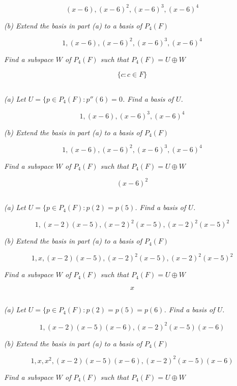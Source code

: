 \documentclass[11pt,oneside,titlepage]{book}
\begin{document}
$$(x - 6), (x - 6)^2, (x - 6)^3, (x - 6)^4$$

\textit{(b) Extend the basis in part (a) to a basis of $P_4(F)$}

$$1, (x - 6), (x - 6)^2, (x - 6)^3, (x - 6)^4$$

\textit{Find a subspace $W$ of $P_4(F)$ such that $P_4(F) = U \oplus W$}

$$\{c: c \in F\}$$

\subsection{}
\textit{(a) Let $U = \{p \in P_4(F): p''(6) = 0$. Find a basis of $U$.}

$$1, (x - 6), (x - 6)^3, (x - 6)^4$$

\textit{(b) Extend the basis in part (a) to a basis of $P_4(F)$}

$$1, (x - 6), (x - 6)^2, (x - 6)^3, (x - 6)^4$$

\textit{Find a subspace $W$ of $P_4(F)$ such that $P_4(F) = U \oplus W$}

$$ (x - 6)^2$$


\subsection{}
\textit{(a) Let $U = \{p \in P_4(F): p(2) = p(5)$. Find a basis of $U$.}

$$1, (x - 2)(x - 5), (x - 2)^2(x - 5), (x - 2)^2(x - 5)^2$$

\textit{(b) Extend the basis in part (a) to a basis of $P_4(F)$}

$$1, x, (x - 2)(x - 5), (x - 2)^2(x - 5), (x - 2)^2(x - 5)^2$$

\textit{Find a subspace $W$ of $P_4(F)$ such that $P_4(F) = U \oplus W$}

$$ x $$

\subsection{}
\textit{(a) Let $U = \{p \in P_4(F): p(2) = p(5) = p(6)$. Find a basis of $U$.}

$$1, (x - 2)(x - 5)(x - 6), (x - 2)^2(x - 5)(x - 6)$$

\textit{(b) Extend the basis in part (a) to a basis of $P_4(F)$}

$$1, x, x^2,  (x - 2)(x - 5)(x - 6), (x - 2)^2(x - 5)(x - 6)$$

\textit{Find a subspace $W$ of $P_4(F)$ such that $P_4(F) = U \oplus W$}
\end{document}
